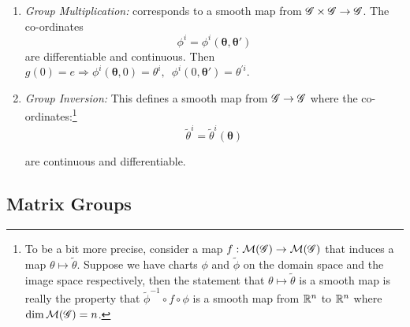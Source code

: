 \begin{enumerate}
\item \emph{Group Multiplication:} corresponds to a smooth map from $\mathscr{G} \times \mathscr{G} \rightarrow \mathscr{G}$. The co-ordinates
$$\phi^i = \phi^i \left( \bm{\theta}, \bm{\theta}' \right)$$
are differentiable and continuous. Then $g(0) = e \Rightarrow \phi^{i} \left( \bm{\theta}, 0 \right) = \theta^{i}, \,\,\, \phi^{i} \left( 0, \bm{\theta}' \right)  = \theta^{\prime i}$.
\item \emph{Group Inversion:} This defines a smooth map from $\mathscr{G} \rightarrow \mathscr{G}$ where the co-ordinates:\footnote{To be a bit more precise, consider a map $f: \mathcal{M}(\mathscr{G}) \rightarrow \mathcal{M}(\mathscr{G})$ that induces a map $\theta \mapsto \tilde{\theta}$. Suppose we have charts $\phi$ and $\tilde{\phi}$ on the domain space and the image space respectively, then the statement that $\theta \mapsto \tilde{\theta}$ is a smooth map is really the property that $\tilde{\phi}^{-1} \circ f \circ \phi$ is a smooth map from $\mathbb{R}^{n}$ to $\mathbb{R}^{n}$ where $\dim \mathcal{M}(\mathscr{G}) = n$.}
$$\tilde{\theta}^i = \tilde{\theta}^i\left( \bm{\theta} \right)$$

\noindent are continuous and differentiable.
\end{enumerate}

\subsection{Matrix Groups}\label{mat}

